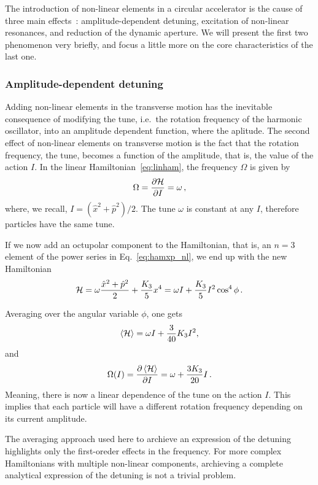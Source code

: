 The introduction of non-linear elements in a circular accelerator is the cause of three main effects~\cite{herr}: amplitude-dependent detuning, excitation of non-linear resonances, and reduction of the dynamic aperture. We will present the first two phenomenon very briefly, and focus a little more on the core characteristics of the last one.

\subsubsection{Amplitude-dependent detuning}

Adding non-linear elements in the transverse motion has the inevitable consequence of modifying the tune, i.e.\ the rotation frequency of the harmonic oscillator, into an amplitude dependent function, where the aplitude.
The second effect of non-linear elements on transverse motion is the fact that the rotation frequency, the tune, becomes a function of the amplitude, that is, the value of the action $I$. In the linear Hamiltonian~\eqref{eq:linham}, the frequency $\Omega$ is given by
\begin{equation}
	\Omega = \pdv{\mathcal{H}}{I} = \omega\,,
\end{equation}
where, we recall, $I=(\hat x^2 + \hat p^2)/2$. The tune $\omega$ is constant at any $I$, therefore particles have the same tune.

If we now add an octupolar component to the Hamiltonian, that is, an $n=3$ element of the power series in Eq.~\ref{eq:hamxp_nl}, we end up with the new Hamiltonian
\begin{equation}
	\mathcal{H} = \omega \frac{\hat x^2 + \hat p^2}{2} + \frac{K_3}{5} x^4 = \omega I + \frac{K_3}{5} I^2 \cos^4\phi\, .
\end{equation}

Averaging over the angular variable $\phi$, one gets
\begin{equation}
	\left<{\mathcal{H}}\right> = \omega I + \frac{3}{40}K_3 I^2,
\end{equation}
%
and
%
\begin{equation}
	\Omega(I) = \pdv{\left<{\mathcal{H}}\right>}{I} = \omega + \frac{3K_3}{20} I\,.
\end{equation}
Meaning, there is now a linear dependence of the tune on the action $I$. This implies that each particle will have a different rotation frequency depending on its current amplitude.

The averaging approach used here to archieve an expression of the detuning highlights only the first-oreder effects in the frequency. For more complex Hamiltonians with multiple non-linear components, archieving a complete analytical expression of the detuning is not a trivial problem.

